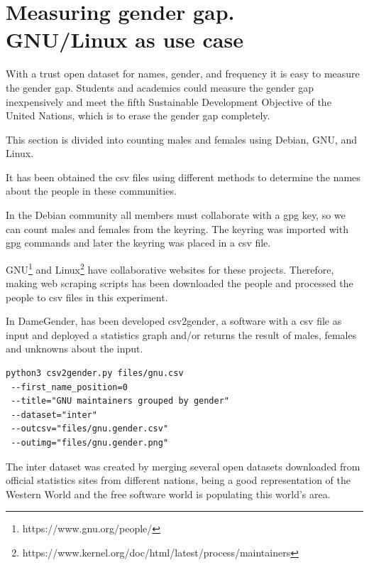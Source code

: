 \documentclass[a4paper]{article}
\begin{document}
\section{Measuring gender gap. GNU/Linux as use case}
\label{sec:measuring}

With a trust open dataset for names, gender, and frequency it is
easy to measure the gender gap. Students and academics could
measure the gender gap inexpensively and meet the fifth
Sustainable Development Objective of the United Nations,
which is to erase the gender gap completely. 

This section is divided into counting males and females using
Debian, GNU, and Linux.

It has been obtained the csv files using different methods
to determine the names about the people in these communities.

In the Debian community all members must collaborate with
a gpg key, so we can count males and females from the keyring.
The keyring was imported with gpg commands and later 
the keyring was placed in a csv file.

GNU\footnote{https://www.gnu.org/people/} and
Linux\footnote{https://www.kernel.org/doc/html/latest/process/maintainers}
have collaborative websites for these projects. Therefore, making web
scraping scripts has been downloaded the people and processed
the people to csv files in this experiment.

In DameGender, has been developed csv2gender, a software with a csv
file as input and deployed a statistics graph and/or returns the result
of males, females and unknowns about the input.

\begin{verbatim}
python3 csv2gender.py files/gnu.csv
 --first_name_position=0
 --title="GNU maintainers grouped by gender"
 --dataset="inter"
 --outcsv="files/gnu.gender.csv"
 --outimg="files/gnu.gender.png"
\end{verbatim}


The inter dataset was created by merging several open datasets
downloaded from official statistics sites from different nations,
being a good representation of the Western World and the free
software world is populating this world's area\cite{gonzalez2008geographic}.
\end{document}

